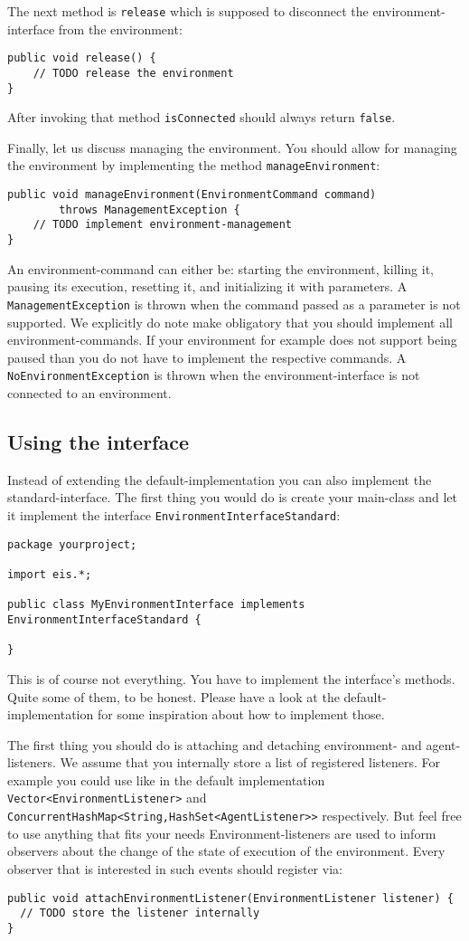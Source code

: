 \documentclass[a4]{article}
\begin{document}
The next method is \texttt{release} which is supposed to disconnect the environment-interface from the environment:
\begin{verbatim}
public void release() {
    // TODO release the environment
}
\end{verbatim}
After invoking that method \texttt{isConnected} should always return \texttt{false}.

Finally, let us discuss managing the environment. You should allow for managing the environment by implementing
the method \texttt{manageEnvironment}:
\begin{verbatim}
public void manageEnvironment(EnvironmentCommand command)
        throws ManagementException {
    // TODO implement environment-management	
}
\end{verbatim}
An environment-command can either be: starting the environment, killing it, pausing its execution, resetting it, and
initializing it with parameters. A \texttt{ManagementException} is thrown when the command passed as a parameter
is not supported. We explicitly do note make obligatory that you should implement all environment-commands. If your
environment for example does not support being paused than you do not have to implement the respective commands.
A \texttt{NoEnvironmentException} is thrown when the environment-interface is not connected to an environment.

\subsection{Using the interface}

Instead of extending the default-implementation you can also implement the standard-interface.
The first thing you would do is create your main-class and let it implement the interface \texttt{EnvironmentInterfaceStandard}:
\begin{verbatim}
package yourproject;

import eis.*;

public class MyEnvironmentInterface implements EnvironmentInterfaceStandard {

}
\end{verbatim}
This is of course not everything. You have to implement the interface's methods. Quite some of them, to be honest.
Please have a look at the default-implementation for some inspiration about how to implement those.

The first thing you should do is attaching and detaching environment- and agent-listeners. 
We assume that you internally store a list of registered listeners. For example you could use like in the default implementation
\texttt{Vector<EnvironmentListener>} and \texttt{ConcurrentHashMap<String,HashSet<AgentListener>>} respectively. 
But feel free to use anything that fits your needs
Environment-listeners are used to inform observers about the change of the state of execution of the environment.
Every observer that is interested in such events should register via:
\begin{verbatim}
public void attachEnvironmentListener(EnvironmentListener listener) {
  // TODO store the listener internally
}
\end{verbatim}
\end{document}
